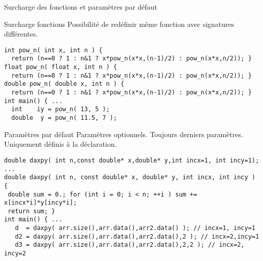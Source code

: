 \documentclass[handout,10pt]{beamer}
\begin{document}
\begin{frame}[fragile]{Surcharge des fonctions et paramètres par défaut}
\tiny
\begin{block}{Surcharge fonctions}
Possibilité de redéfinir même fonction avec signatures différentes.
\begin{lstlisting}
int pow_n( int x, int n ) { 
  return (n==0 ? 1 : n&1 ? x*pow_n(x*x,(n-1)/2) : pow_n(x*x,n/2)); }
float pow_n( float x, int n ) { 
  return (n==0 ? 1 : n&1 ? x*pow_n(x*x,(n-1)/2) : pow_n(x*x,n/2)); }
double pow_n( double x, int n ) { 
  return (n==0 ? 1 : n&1 ? x*pow_n(x*x,(n-1)/2) : pow_n(x*x,n/2)); }
int main() { ...
  int    iy = pow_n( 13, 5 );
  double  y = pow_n( 11.5, 7 );
\end{lstlisting}
\end{block}

\begin{block}{Paramètres par défaut}
Paramètres optionnels. Toujours derniers paramètres. Uniquement définis à la déclaration.
\begin{lstlisting}
double daxpy( int n,const double* x,double* y,int incx=1, int incy=1);
...
double daxpy( int n, const double* x, double* y, int incx, int incy ) {
 double sum = 0.; for (int i = 0; i < n; ++i ) sum += x[incx*i]*y[incy*i];
 return sum; }
int main() { ...
   d  = daxpy( arr.size(),arr.data(),arr2.data() ); // incx=1, incy=1
   d2 = daxpy( arr.size(),arr.data(),arr2.data(),2 ); // incx=2,incy=1
   d3 = daxpy( arr.size(),arr.data(),arr2.data(),2,2 ); // incx=2, incy=2
\end{lstlisting}
\end{block}

\end{frame}
\end{document}
